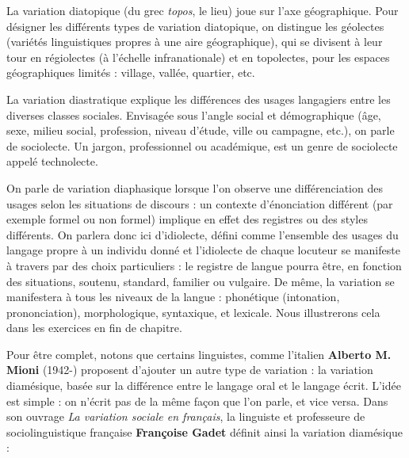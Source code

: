 La variation diatopique (du grec \textit{topos}, le lieu) joue sur l’axe géographique. Pour désigner les différents types de variation diatopique, on distingue les géolectes (variétés linguistiques propres à une aire géographique), qui se divisent à leur tour en régiolectes (à l’échelle infranationale) et en topolectes, pour les espaces géographiques limités : village, vallée, quartier, etc.

La variation diastratique explique les différences des usages langagiers entre les diverses classes sociales. Envisagée sous l’angle social et démographique (âge, sexe, milieu social, profession, niveau d’étude, ville ou campagne, etc.), on parle de sociolecte. Un jargon, professionnel ou académique, est un genre de sociolecte appelé technolecte.

On parle de variation diaphasique lorsque l’on observe une différenciation des usages selon les situations de discours : un contexte d’énonciation différent (par exemple formel ou non formel) implique en effet des registres ou des styles différents. On parlera donc ici d’idiolecte, défini comme l’ensemble des usages du langage propre à un individu donné et l’idiolecte
de chaque locuteur se manifeste à travers par des choix particuliers : le registre de langue pourra être, en fonction des situations, soutenu, standard, familier ou vulgaire. De même, la variation se manifestera à tous les niveaux de la langue : phonétique (intonation, prononciation), morphologique, syntaxique, et lexicale. Nous illustrerons cela dans les exercices en fin de chapitre.

Pour être complet, notons que certains linguistes, comme l’italien \textbf{Alberto M. Mioni} (1942-) proposent d’ajouter un autre type de variation : la variation diamésique, basée sur la différence entre le langage oral et le langage écrit. L’idée est simple : on n’écrit pas de la même façon que l’on parle, et vice versa. Dans son ouvrage \textit{La variation sociale en français}, la linguiste et professeure de sociolinguistique française \textbf{Françoise Gadet} définit ainsi la variation diamésique :

